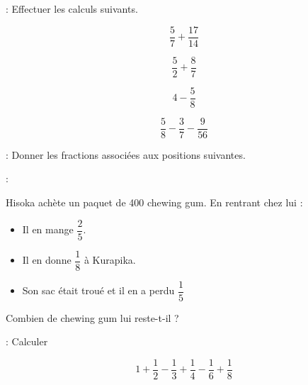  : Effectuer les calculs suivants.

\begin{multicols}{2}
    $$\dfrac{5}{7}+\dfrac{17}{14}$$\vspace*{-0.5em}
    
    $$\dfrac{5}{2}+\dfrac{8}{7}$$\vspace*{-0.5em}

    \columnbreak
    $$4-\dfrac{5}{8}$$\vspace*{-0.5em}

    $$\dfrac{5}{8}-\dfrac{3}{7}-\dfrac{9}{56}$$\vspace*{-0.5em}

\end{multicols}

 : Donner les fractions associées aux positions suivantes.





 :    


Hisoka achète un paquet de 400 chewing gum. En rentrant chez lui :
\begin{itemize}
    \item Il en mange $\dfrac{2}{5}$.
    \item Il en donne $\dfrac{1}{8}$ à Kurapika.
    \item Son sac était troué et il en a perdu $\dfrac{1}{5}$
\end{itemize}
Combien de chewing gum lui reste-t-il ?


\exo{}{} :  Calculer  

$$1+\dfrac{1}{2}-\dfrac{1}{3}+\dfrac{1}{4}-\dfrac{1}{6}+\dfrac{1}{8}$$

